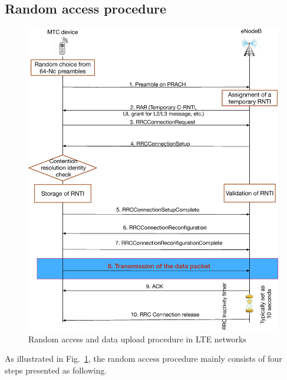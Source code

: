 \subsection{Random access procedure}
\begin{figure}[!t]
	\centering
	\includegraphics[width=\linewidth]{Chapter6/Figures/lte-ra.eps}
	\caption{Random access and data upload procedure in LTE networks}
	\label{fig:lte-ra}
\end{figure}
As illustrated in Fig.~\ref{fig:lte-ra}, the random access procedure mainly consists of four steps presented as following. 

